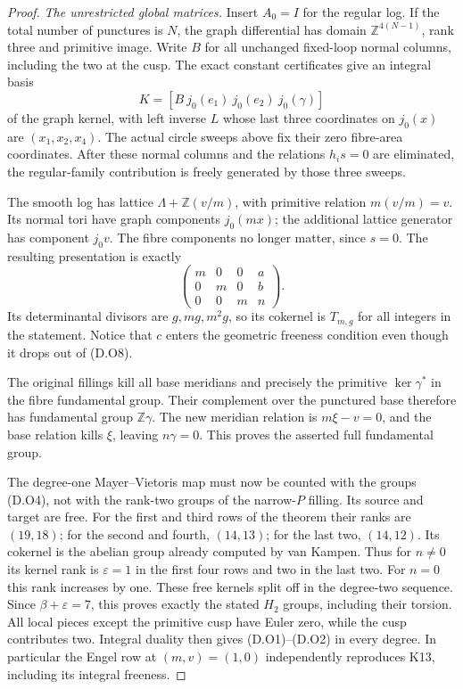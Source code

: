 \begin{proof}
\emph{The unrestricted global matrices.}
Insert $A_0=I$ for the regular log. If the total number
of punctures is $N$, the graph differential has domain
$\mathbb Z^{4(N-1)}$, rank three and primitive image.
Write $B$ for all unchanged fixed-loop normal columns,
including the two at the cusp. The exact constant
certificates give an integral basis
\[
 K=[B\ j_0(e_1)\ j_0(e_2)\ j_0(\gamma)]
\]
of the graph kernel, with left inverse $L$ whose last
three coordinates on $j_0(x)$ are $(x_1,x_2,x_4)$.
The actual circle sweeps above fix their zero fibre-area
coordinates. After these normal columns and the relations
$h_is=0$ are eliminated, the regular-family contribution
is freely generated by those three sweeps.

The smooth log has lattice $\Lambda+\mathbb Z(v/m)$,
with primitive relation $m(v/m)=v$.
Its normal tori have graph components $j_0(mx)$;
the additional lattice generator has component $j_0v$.
The fibre components no longer matter, since $s=0$.
The resulting presentation is exactly
\[
  \begin{pmatrix}
    m&0&0&a\\0&m&0&b\\0&0&m&n
  \end{pmatrix}.
 \tag{D.O8}
\]
Its determinantal divisors are $g,mg,m^2g$,
so its cokernel is $T_{m,g}$ for all integers in the
statement. Notice that $c$ enters the geometric
freeness condition even though it drops out of (D.O8).

The original fillings kill all base meridians and
precisely the primitive $\ker\gamma^*$ in the fibre
fundamental group. Their complement over the punctured
base therefore has fundamental group $\mathbb Z\gamma$.
The new meridian relation is $m\xi-v=0$, and the base
relation kills $\xi$, leaving $n\gamma=0$. This proves
the asserted full fundamental group.

The degree-one Mayer--Vietoris map must now be counted
with the groups (D.O4), not with the rank-two groups of
the narrow-$P$ filling. Its source and target are free.
For the first and third rows of the theorem their ranks
are $(19,18)$; for the second and fourth, $(14,13)$;
for the last two, $(14,12)$.
Its cokernel is the abelian group already computed by
van Kampen. Thus for $n\ne0$ its kernel rank is
$\varepsilon=1$ in the first four rows and two in the
last two. For $n=0$ this rank increases by one.
These free kernels split off in the degree-two sequence.
Since $\beta+\varepsilon=7$, this proves exactly the
stated $H_2$ groups, including their torsion.
All local pieces except the primitive cusp have Euler
zero, while the cusp contributes two. Integral duality
then gives (D.O1)--(D.O2) in every degree. In particular
the Engel row at $(m,v)=(1,0)$ independently reproduces
K13, including its integral freeness.


\end{proof}
